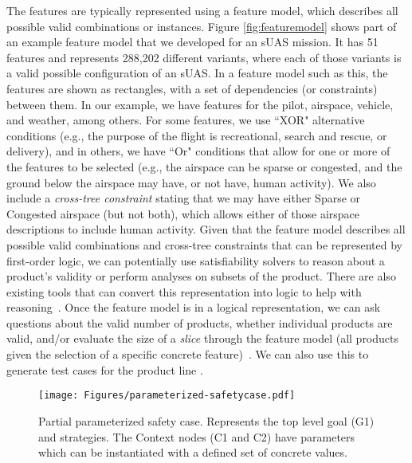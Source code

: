 The features are typically represented using a feature model, which describes all possible valid combinations or instances. Figure \ref{fig:featuremodel} shows part of an example feature model that we developed for an sUAS mission. It has 51 features and represents 288,202 different variants, %
where each of those variants is a valid possible configuration of an sUAS. In a feature model such as this, the features are shown as rectangles, with a set of dependencies (or constraints) between them. In our example, we have features for the pilot, airspace, vehicle, and weather, among others. For some features, we use ``XOR" alternative conditions (e.g., the purpose of the flight is recreational, search and rescue, or delivery), and in others, we have ``Or" conditions that allow for one or more of the features to be selected (e.g., the airspace can be sparse or congested, and the ground below the airspace may have, or not have, human activity). We also include a \textit{cross-tree constraint} stating that we may have either Sparse or Congested airspace (but not both), which allows either of those airspace descriptions to include human activity. 
Given that the feature model describes all possible valid combinations and cross-tree constraints that can be represented by first-order logic, we can potentially use satisfiability solvers to reason about a product's validity or perform analyses on subsets of the product. There are also existing tools that can convert this representation into logic to help with reasoning~\cite{BENAVIDES2010615,fama}. 
Once the feature model is in a logical representation, we can ask questions about the valid number of products, whether individual products are valid, and/or evaluate the size of a \textit{slice} through the feature model (all products given the selection of a specific concrete feature)~\cite{fama,featureide,10.1145/3176644}. We can also use this to generate test cases for the product line \cite{5456077}.

\begin{figure}[]
\centering
\texttt{[image: Figures/parameterized-safetycase.pdf]}\caption{Partial parameterized safety case. Represents the top level goal (G1) and strategies. The Context nodes (C1 and C2) have parameters which can be instantiated with a defined set of concrete values.}\label{fig:param}
\end{figure}



\iffalse
\myra{should we include below?}
\robyn{either way, depending on whether it will confuse readers. We aren't solving it here but it is still open.}
  A traditional safety case \cite{} tends to focus on providing evidence that the system is safe for use, and therefore the solution nodes (circles) represent evidence. However, for on-entry safety assessments, solutions (i.e., evidence) can also represent risks that carry negative connotations and are likely to lead to on-entry denials or conditional-admits such as a case in which the on-exit flight log of the sUAS showed significant vibration when flying in windy conditions. Determining how to balance this negative claim, including when it occurred within the timeline of otherwise successful flights, represents one of the open challenges.
\fi


